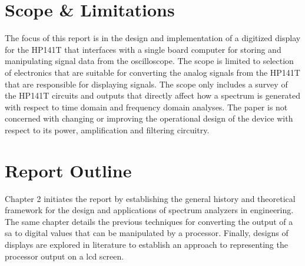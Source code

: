 \documentclass[class=report,11pt,crop=false]{standalone}
\begin{document}
\section{Scope \& Limitations}
The focus of this report is in the design and implementation of a digitized display for the HP141T that interfaces with a single board computer for storing and manipulating signal data from the oscilloscope. The scope is limited to selection of electronics that are suitable for converting the analog signals from the HP141T that are responsible for displaying signals. The scope only includes a survey of the HP141T circuits and outputs that directly affect how a spectrum is generated with respect to time domain and frequency domain analyses. The paper is not concerned with changing or improving the operational design of the device with respect to its power, amplification and filtering circuitry. 

\section{Report Outline}
Chapter 2 initiates the report by establishing the general history and theoretical framework for the design and applications of spectrum analyzers in engineering. The same chapter details the previous techniques for converting the output of a \acrshort{sa} to digital values that can be manipulated by a processor. Finally, designs of displays are explored in literature to establish an approach to representing the processor output on a \acrshort{lcd} screen. 
\ifstandalone

\printnoidxglossary[type=\acronymtype,nonumberlist]
\fi
\end{document}
